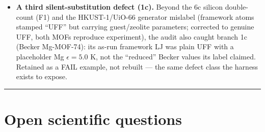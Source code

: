 \begin{itemize}
  explanation was tested: at the actual supercells and cutoffs of the
  published runs, a brute-force image check found no within-cutoff
  mis-imaged pairs for HKUST-1, Si-CHA, or MFI, so the root cause is not
  established. The classical MOF branches are therefore reported from
  RASPA3 (2a, 3a) or RASPA2 (1a), or presented as audited examples with
  this limitation stated (1b, 1c, 1d, 2b, 3b); 4c is retained because it is
  directly cross-engine checked, not because of any orthogonality
  assumption. For
  4c itself the strict-vs-Tier-B verdict is engine-marginal: the q\_st
  deviation straddles the \(\pm2.0\) boundary (native \(+1.99\), inside;
  RASPA3 \(+2.24\), outside), so we report it as Tier-B --- a worked
  example, on a charged system, of the verdict fragility this harness
  exists to expose. No result in this report depends on the native
  charged-MOF path.
\item
  \textbf{A third silent-substitution defect (1c).} Beyond the 6c silicon
  double-count (F1) and the HKUST-1/UiO-66 generator mislabel (framework
  atoms stamped ``UFF'' but carrying guest/zeolite parameters; corrected to
  genuine UFF, both MOFs reproduce experiment), the audit also caught
  branch 1c (Becker Mg-MOF-74): its as-run framework LJ was plain UFF with
  a placeholder Mg \(\epsilon = 5.0\) K, not the ``reduced'' Becker values
  its label claimed. Retained as a FAIL example, not rebuilt --- the same
  defect class the harness exists to expose.
\end{itemize}

\begin{center}\rule{0.5\linewidth}{0.5pt}\end{center}

\section{Open scientific questions}\label{open-scientific-questions}

